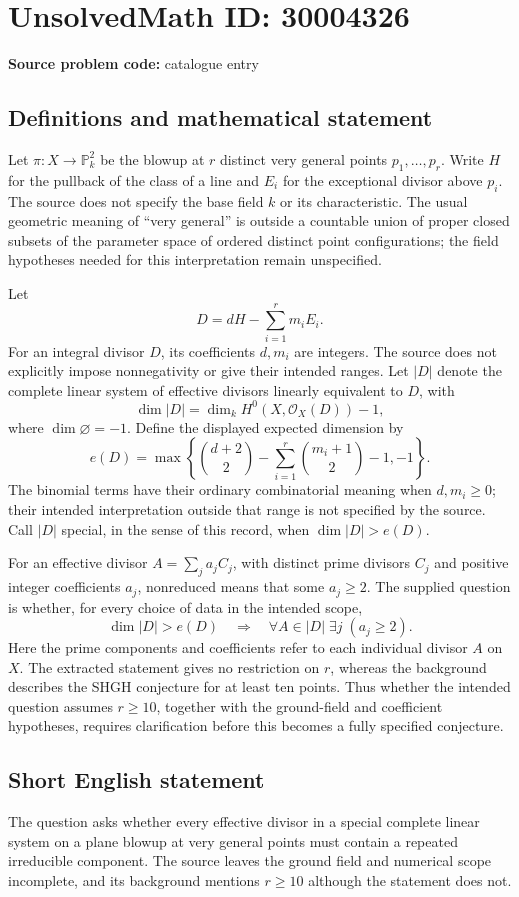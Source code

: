 \documentclass[11pt]{article}
\begin{document}
\section*{UnsolvedMath ID: 30004326}
\textbf{Source problem code:} catalogue entry
\subsection{Definitions and mathematical statement}
Let \(\pi:X\to\mathbb{P}^{2}_{k}\) be the blowup at \(r\) distinct very general points \(p_1,\ldots,p_r\). Write \(H\) for the pullback of the class of a line and \(E_i\) for the exceptional divisor above \(p_i\). The source does not specify the base field \(k\) or its characteristic. The usual geometric meaning of ``very general'' is outside a countable union of proper closed subsets of the parameter space of ordered distinct point configurations; the field hypotheses needed for this interpretation remain unspecified.

Let
\[
D=dH-\sum_{i=1}^{r}m_iE_i.
\]
For an integral divisor \(D\), its coefficients \(d,m_i\) are integers. The source does not explicitly impose nonnegativity or give their intended ranges. Let \(|D|\) denote the complete linear system of effective divisors linearly equivalent to \(D\), with
\[
\dim|D|=\dim_k H^0(X,\mathcal{O}_X(D))-1,
\]
where \(\dim\varnothing=-1\). Define the displayed expected dimension by
\[
e(D)=\max\left\{\binom{d+2}{2}-\sum_{i=1}^{r}\binom{m_i+1}{2}-1,-1\right\}.
\]
The binomial terms have their ordinary combinatorial meaning when \(d,m_i\geq0\); their intended interpretation outside that range is not specified by the source. Call \(|D|\) special, in the sense of this record, when \(\dim|D|>e(D)\).

For an effective divisor \(A=\sum_j a_jC_j\), with distinct prime divisors \(C_j\) and positive integer coefficients \(a_j\), nonreduced means that some \(a_j\geq2\). The supplied question is whether, for every choice of data in the intended scope,
\[
\dim|D|>e(D)
\quad\Longrightarrow\quad
\forall A\in|D|\;\exists j\;(a_j\geq2).
\]
Here the prime components and coefficients refer to each individual divisor \(A\) on \(X\). The extracted statement gives no restriction on \(r\), whereas the background describes the SHGH conjecture for at least ten points. Thus whether the intended question assumes \(r\geq10\), together with the ground-field and coefficient hypotheses, requires clarification before this becomes a fully specified conjecture.
\subsection{Short English statement}
The question asks whether every effective divisor in a special complete linear system on a plane blowup at very general points must contain a repeated irreducible component. The source leaves the ground field and numerical scope incomplete, and its background mentions \(r\geq10\) although the statement does not.
\end{document}
